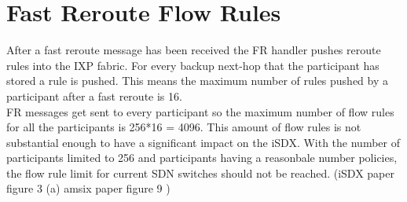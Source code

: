 \section{\label{chapter5:number of flow rules}Fast Reroute Flow Rules}

After a fast reroute message has been received the FR handler pushes reroute rules into the IXP fabric. For every backup next-hop that the participant has stored a rule is pushed. This means the maximum number of rules pushed by a participant after a fast reroute is 16. \\
FR messages get sent to every participant so the maximum number of flow rules for all the participants is 256*16 = 4096. This amount of flow rules is not substantial enough to have a significant impact on the iSDX. With the number of participants limited to 256 and participants having a reasonbale number policies, the flow rule limit for current SDN switches should not be reached. (iSDX paper figure 3 (a) amsix paper figure 9 )\\
